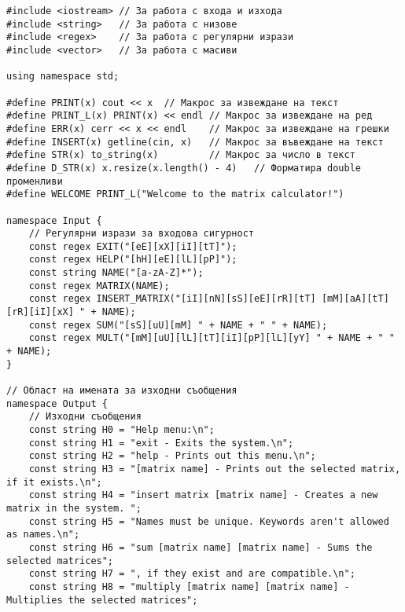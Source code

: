 \documentclass[oneside]{book}
\begin{document}
\begin{mdframed}\begin{lstlisting}
#include <iostream>	// За работа с входа и изхода
#include <string>	// За работа с низове
#include <regex>	// За работа с регулярни изрази
#include <vector>	// За работа с масиви

using namespace std;

#define PRINT(x) cout << x	// Макрос за извеждане на текст
#define PRINT_L(x) PRINT(x) << endl	// Макрос за извеждане на ред
#define ERR(x) cerr << x << endl	// Макрос за извеждане на грешки
#define INSERT(x) getline(cin, x)	// Макрос за въвеждане на текст
#define STR(x) to_string(x)			// Макрос за число в текст
#define D_STR(x) x.resize(x.length() - 4)	// Форматира double променливи
#define WELCOME PRINT_L("Welcome to the matrix calculator!")

namespace Input {
	// Регулярни изрази за входова сигурност
	const regex EXIT("[eE][xX][iI][tT]");
	const regex HELP("[hH][eE][lL][pP]");
	const string NAME("[a-zA-Z]*");
	const regex MATRIX(NAME);
	const regex INSERT_MATRIX("[iI][nN][sS][eE][rR][tT] [mM][aA][tT][rR][iI][xX] " + NAME);
	const regex SUM("[sS][uU][mM] " + NAME + " " + NAME);
	const regex MULT("[mM][uU][lL][tT][iI][pP][lL][yY] " + NAME + " " + NAME);
}

// Област на имената за изходни съобщения
namespace Output {
	// Изходни съобщения
	const string H0 = "Help menu:\n";
	const string H1 = "exit - Exits the system.\n";
	const string H2 = "help - Prints out this menu.\n";
	const string H3 = "[matrix name] - Prints out the selected matrix, if it exists.\n";
	const string H4 = "insert matrix [matrix name] - Creates a new matrix in the system. ";
	const string H5 = "Names must be unique. Keywords aren't allowed as names.\n";
	const string H6 = "sum [matrix name] [matrix name] - Sums the selected matrices";
	const string H7 = ", if they exist and are compatible.\n";
	const string H8 = "multiply [matrix name] [matrix name] - Multiplies the selected matrices";

\end{lstlisting}\end{mdframed}
\end{document}
